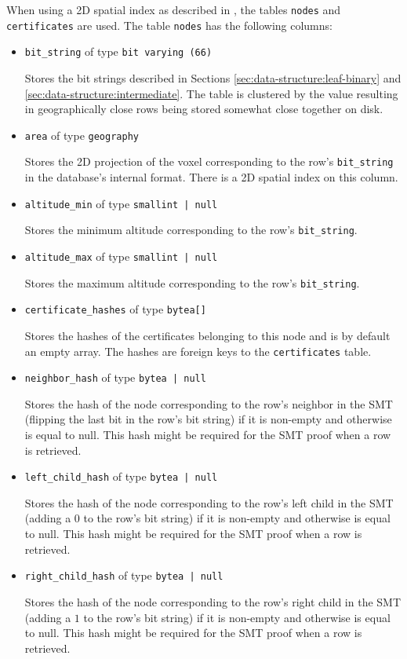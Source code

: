 \documentclass[10pt,conference,compsocconf]{IEEEtran}
\begin{document}
When using a 2D spatial index as described in , the tables \texttt{nodes} and \texttt{certificates} are used.
The table \texttt{nodes} has the following columns:
\begin{itemize}
	\item \texttt{bit\_string} of type \texttt{bit varying (66)}
	
	Stores the bit strings described in Sections \ref{sec:data-structure:leaf-binary} and \ref{sec:data-structure:intermediate}.
	The table is clustered by the value resulting in geographically close rows being stored somewhat close together on disk.
	\item \texttt{area} of type \texttt{geography}
	
	Stores the 2D projection of the voxel corresponding to the row's \texttt{bit\_string} in the database's internal format.
	There is a 2D spatial index on this column.
	\item \texttt{altitude\_min} of type \texttt{smallint | null}
	
	Stores the minimum altitude corresponding to the row's \texttt{bit\_string}.
	\item \texttt{altitude\_max} of type \texttt{smallint | null}
	
	Stores the maximum altitude corresponding to the row's \texttt{bit\_string}.
	\item \texttt{certificate\_hashes} of type \texttt{bytea[]}
	
	Stores the hashes of the certificates belonging to this node and is by default an empty array.
	The hashes are foreign keys to the \texttt{certificates} table.
	\item \texttt{neighbor\_hash} of type \texttt{bytea | null}
	
	Stores the hash of the node corresponding to the row's neighbor in the SMT (flipping the last bit in the row's bit string) if it is non-empty and otherwise is equal to null.
	This hash might be required for the SMT proof when a row is retrieved.
	\item \texttt{left\_child\_hash} of type \texttt{bytea | null}
	
	Stores the hash of the node corresponding to the row's left child in the SMT (adding a $0$ to the row's bit string) if it is non-empty and otherwise is equal to null.
	This hash might be required for the SMT proof when a row is retrieved.
	\item \texttt{right\_child\_hash} of type \texttt{bytea | null}
	
	Stores the hash of the node corresponding to the row's right child in the SMT (adding a $1$ to the row's bit string) if it is non-empty and otherwise is equal to null.
	This hash might be required for the SMT proof when a row is retrieved.
\end{itemize}
\end{document}
